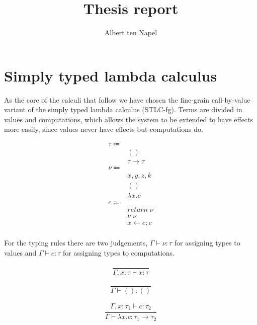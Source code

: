 \documentclass[12pt]{article}
\title{Thesis report}
\author{Albert ten Napel}
\date{}
\newcommand\type[0]{\tau}
\newcommand\tunit[0]{()}
\newcommand\tarr[2]{#1 \rightarrow #2}
\newcommand\val[0]{\nu}
\newcommand\vunit[0]{()}
\newcommand\vabs[2]{\lambda #1 . #2}
\newcommand\comp[0]{c}
\newcommand\creturn[1]{\textit{return} \; #1}
\newcommand\capp[2]{#1 \; #2}
\newcommand\cdo[3]{#1 \leftarrow #2 ; #3}
\begin{document}
\maketitle

\section{Simply typed lambda calculus}

As the core of the calculi that follow we have chosen the fine-grain call-by-value\cite{finegrain} variant of the simply typed lambda calculus (STLC-fg). Terms are divided in values and computations, which allows the system to be extended to have effects more easily, since values never have effects but computations do.

\begin{align*}
	\type \Coloneqq 	& 							\tag{types} \\
				& \tunit						\tag{unit type} \\
				& \tarr{\type}{\type}				\tag{type of functions} \\
	\val \Coloneqq	&							\tag{values} \\
				& x, y, z, k						\tag{variables} \\
				& \vunit						\tag{unit value} \\
				& \vabs{x}{\comp}					\tag{abstraction} \\
	\comp \Coloneqq	&							\tag{computations} \\
				& \creturn{\val}					\tag{return value as computation} \\
				& \capp{\val}{\val}					\tag{application} \\
				& \cdo{x}{\comp}{\comp}				\tag{sequencing} \\
\end{align*}

\newpage
For the typing rules there are two judgements,
$\Gamma \vdash \val : \type$ for assigning types to values and $\Gamma \vdash \comp : \type$ for assigning types to computations.

\begin{minipage}{0.33\textwidth}
	\[\frac{
	}{
		\Gamma, x : \type \vdash x : \type
	}\]
\end{minipage}
\begin{minipage}{0.33\textwidth}
	\[\frac{
	}{
		\Gamma \vdash \vunit : \tunit
	}\]
\end{minipage}
\begin{minipage}{0.33\textwidth}
\[\frac{
	\begin{array}{l}
	\Gamma, x : \type_1 \vdash \comp : \type_2
	\end{array}
}{
	\Gamma \vdash \vabs{x}{\comp} : \tarr{\type_1}{\type_2}
}\]
\end{minipage}
\end{document}
